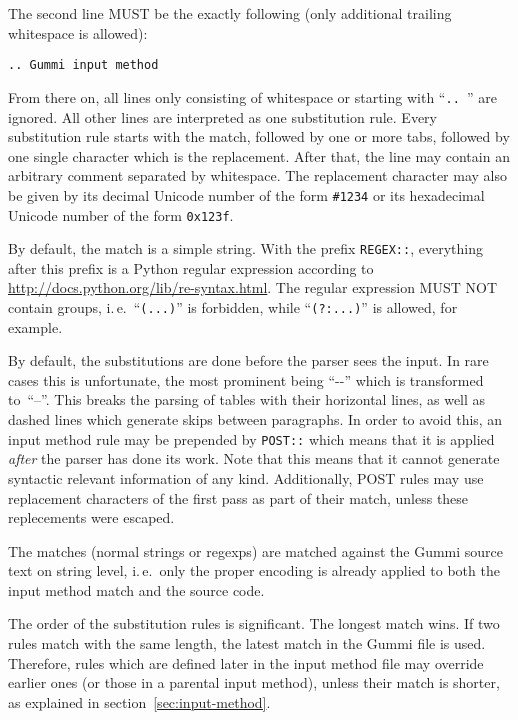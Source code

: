 \documentclass[12pt,openany]{book}
\begin{document}
The second line MUST be the exactly following (only additional trailing
whitespace is allowed):

\begin{lstlisting}
.. Gummi input method
\end{lstlisting}

From there on, all lines only consisting of whitespace or starting with
``\verb*|.. |'' are ignored.  All other lines are interpreted as one
substitution rule.  Every substitution rule starts with the match, followed by
one or more tabs, followed by one single character which is the replacement.
After that, the line may contain an arbitrary comment separated by whitespace.
The replacement character may also be given by its decimal Unicode number of
the form \verb|#1234| or its hexadecimal Unicode number of the form
\verb|0x123f|.

By default, the match is a simple string.  With the prefix \verb|REGEX::|,
everything after this prefix is a Python regular expression according to
\url{http://docs.python.org/lib/re-syntax.html}.  The regular expression MUST
NOT contain groups, i.\,e.\ ``\verb|(...)|'' is forbidden, while
``\verb|(?:...)|'' is allowed, for example.

By default, the substitutions are done before the parser sees the input.  In
rare cases this is unfortunate, the most prominent being ``\mbox{-{}-}'' which
is transformed to~``--''.  This breaks the parsing of tables with their
horizontal lines, as well as dashed lines which generate skips between
paragraphs.  In order to avoid this, an input method rule may be prepended by
\verb|POST::| which means that it is applied \emph{after} the parser has done
its work.  Note that this means that it cannot generate syntactic relevant
information of any kind.  Additionally, POST rules may use replacement
characters of the first pass as part of their match, unless these replecements
were escaped.

The matches (normal strings or regexps) are matched against the Gummi source
text on string level, i.\,e.\ only the proper encoding is already applied to
both the input method match and the source code.

The order of the substitution rules is significant.  The longest match wins.
If two rules match with the same length, the latest match in the Gummi file is
used.  Therefore, rules which are defined later in the input method file may
override earlier ones (or those in a parental input method), unless their match
is shorter, as explained in section~\ref{sec:input-method}.
\end{document}
